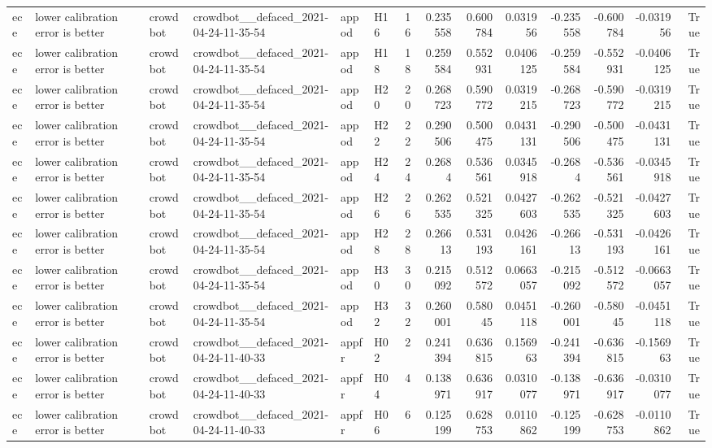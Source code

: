 \begin{longtable}{llllllrrrrrrrr}
ece & lower calibration error is better & crowdbot & crowdbot\_\_defaced\_2021-04-24-11-35-54 & appod & H16 & 16 & 0.235558 & 0.600784 & 0.031956 & -0.235558 & -0.600784 & -0.031956 & True \\
ece & lower calibration error is better & crowdbot & crowdbot\_\_defaced\_2021-04-24-11-35-54 & appod & H18 & 18 & 0.259584 & 0.552931 & 0.0406125 & -0.259584 & -0.552931 & -0.0406125 & True \\
ece & lower calibration error is better & crowdbot & crowdbot\_\_defaced\_2021-04-24-11-35-54 & appod & H20 & 20 & 0.268723 & 0.590772 & 0.0319215 & -0.268723 & -0.590772 & -0.0319215 & True \\
ece & lower calibration error is better & crowdbot & crowdbot\_\_defaced\_2021-04-24-11-35-54 & appod & H22 & 22 & 0.290506 & 0.500475 & 0.0431131 & -0.290506 & -0.500475 & -0.0431131 & True \\
ece & lower calibration error is better & crowdbot & crowdbot\_\_defaced\_2021-04-24-11-35-54 & appod & H24 & 24 & 0.2684 & 0.536561 & 0.0345918 & -0.2684 & -0.536561 & -0.0345918 & True \\
ece & lower calibration error is better & crowdbot & crowdbot\_\_defaced\_2021-04-24-11-35-54 & appod & H26 & 26 & 0.262535 & 0.521325 & 0.0427603 & -0.262535 & -0.521325 & -0.0427603 & True \\
ece & lower calibration error is better & crowdbot & crowdbot\_\_defaced\_2021-04-24-11-35-54 & appod & H28 & 28 & 0.26613 & 0.531193 & 0.0426161 & -0.26613 & -0.531193 & -0.0426161 & True \\
ece & lower calibration error is better & crowdbot & crowdbot\_\_defaced\_2021-04-24-11-35-54 & appod & H30 & 30 & 0.215092 & 0.512572 & 0.0663057 & -0.215092 & -0.512572 & -0.0663057 & True \\
ece & lower calibration error is better & crowdbot & crowdbot\_\_defaced\_2021-04-24-11-35-54 & appod & H32 & 32 & 0.260001 & 0.58045 & 0.0451118 & -0.260001 & -0.58045 & -0.0451118 & True \\
ece & lower calibration error is better & crowdbot & crowdbot\_\_defaced\_2021-04-24-11-40-33 & appfr & H02 & 2 & 0.241394 & 0.636815 & 0.156963 & -0.241394 & -0.636815 & -0.156963 & True \\
ece & lower calibration error is better & crowdbot & crowdbot\_\_defaced\_2021-04-24-11-40-33 & appfr & H04 & 4 & 0.138971 & 0.636917 & 0.0310077 & -0.138971 & -0.636917 & -0.0310077 & True \\
ece & lower calibration error is better & crowdbot & crowdbot\_\_defaced\_2021-04-24-11-40-33 & appfr & H06 & 6 & 0.125199 & 0.628753 & 0.0110862 & -0.125199 & -0.628753 & -0.0110862 & True \\

\end{longtable}
